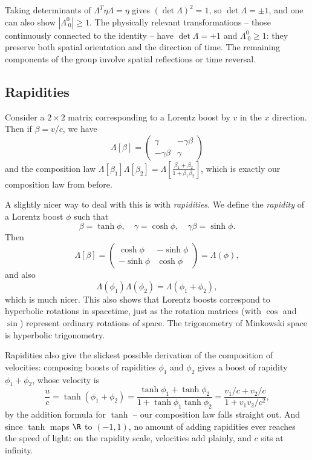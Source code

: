 \begin{remark}
	Taking determinants of $\Lambda^T \eta \Lambda = \eta$ gives $(\det \Lambda)^2 = 1$, so $\det \Lambda = \pm 1$, and one can also show $|\Lambda^0_{\;0}| \geq 1$. The physically relevant transformations -- those continuously connected to the identity -- have $\det \Lambda = +1$ and $\Lambda^0_{\;0} \geq 1$: they preserve both spatial orientation and the direction of time. The remaining components of the group involve spatial reflections or time reversal.
\end{remark}

\subsection{Rapidities}

Consider a $2 \times 2$ matrix corresponding to a Lorentz boost by $v$ in the $x$ direction. Then if $\beta = v/c$, we have
$$
\Lambda[\beta] = \begin{pmatrix}
	\gamma & -\gamma \beta \\
	-\gamma \beta & \gamma
\end{pmatrix}
$$
and the composition law $\Lambda[\beta_1] \Lambda[\beta_2] = \Lambda\left[\frac{\beta_1 + \beta_2}{1 + \beta_1 \beta_2}\right]$,
which is exactly our composition law from before.

A slightly nicer way to deal with this is with \emph{rapidities}.
We define the \emph{rapidity} of a Lorentz boost $\phi$ such that
$$
\beta = \tanh \phi, \quad \gamma = \cosh \phi,\quad \gamma \beta = \sinh \phi.
$$
Then
$$
\Lambda[\beta] = \begin{pmatrix}
	\cosh \phi & - \sinh \phi \\
	-\sinh \phi & \cosh \phi 
\end{pmatrix} = \Lambda(\phi),
$$
and also
$$
\Lambda(\phi_1) \Lambda(\phi_2) = \Lambda(\phi_1 + \phi_2),
$$
which is much nicer. This also shows that Lorentz boosts correspond to hyperbolic rotations in spacetime, just as the rotation matrices (with $\cos$ and $\sin$) represent ordinary rotations of space. The trigonometry of Minkowski space is hyperbolic trigonometry.

Rapidities also give the slickest possible derivation of the composition of velocities: composing boosts of rapidities $\phi_1$ and $\phi_2$ gives a boost of rapidity $\phi_1 + \phi_2$, whose velocity is
$$
\frac{u}{c} = \tanh(\phi_1 + \phi_2) = \frac{\tanh \phi_1 + \tanh\phi_2}{1 + \tanh\phi_1 \tanh\phi_2} = \frac{v_1/c + v_2/c}{1 + v_1v_2/c^2},
$$
by the addition formula for $\tanh$ -- our composition law falls straight out. And since $\tanh$ maps $\R$ to $(-1, 1)$, no amount of adding rapidities ever reaches the speed of light: on the rapidity scale, velocities add plainly, and $c$ sits at infinity.


